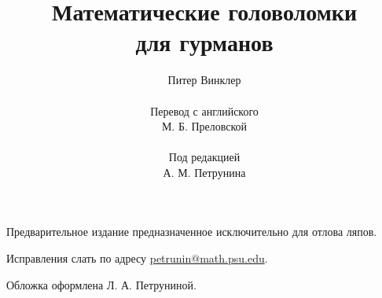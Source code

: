 \documentclass[twoside]{book}
\begin{document}
\title{Математические головоломки\\
для гурманов}
\author{Питер Винклер\\
\\
Перевод с английского 
\\
М. Б. Преловской
\\
\\
Под редакцией
\\
 А. М. Петрунина}
\date{}
\maketitle

\thispagestyle{empty}

Предварительное издание предназначенное исключительно для отлова ляпов. 

Исправления слать по адресу 
\url{petrunin@math.psu.edu}.

Обложка оформлена Л. А. Петруниной. 

\vfill





























{
\sloppy

\printindex

}

\newpage

{
\sloppy

\tableofcontents

}
\end{document}
